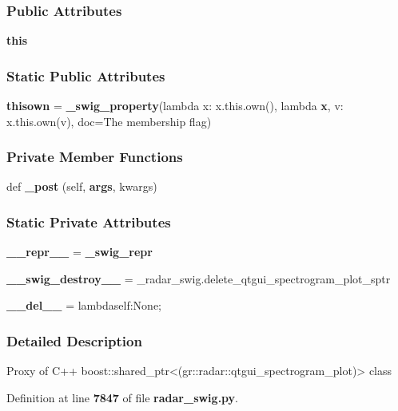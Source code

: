 \subsubsection*{Public Attributes}
\begin{DoxyCompactItemize}
\item 
{\bf this}
\end{DoxyCompactItemize}
\subsubsection*{Static Public Attributes}
\begin{DoxyCompactItemize}
\item 
{\bf thisown} = {\bf \+\_\+swig\+\_\+property}(lambda x\+: x.\+this.\+own(), lambda {\bf x}, v\+: x.\+this.\+own(v), doc=\textquotesingle{}The membership flag\textquotesingle{})
\end{DoxyCompactItemize}
\subsubsection*{Private Member Functions}
\begin{DoxyCompactItemize}
\item 
def {\bf \+\_\+post} (self, {\bf args}, kwargs)
\end{DoxyCompactItemize}
\subsubsection*{Static Private Attributes}
\begin{DoxyCompactItemize}
\item 
{\bf \+\_\+\+\_\+repr\+\_\+\+\_\+} = {\bf \+\_\+swig\+\_\+repr}
\item 
{\bf \+\_\+\+\_\+swig\+\_\+destroy\+\_\+\+\_\+} = \+\_\+radar\+\_\+swig.\+delete\+\_\+qtgui\+\_\+spectrogram\+\_\+plot\+\_\+sptr
\item 
{\bf \+\_\+\+\_\+del\+\_\+\+\_\+} = lambdaself\+:\+None;
\end{DoxyCompactItemize}


\subsubsection{Detailed Description}
\begin{DoxyVerb}Proxy of C++ boost::shared_ptr<(gr::radar::qtgui_spectrogram_plot)> class\end{DoxyVerb}
 

Definition at line {\bf 7847} of file {\bf radar\+\_\+swig.\+py}.



